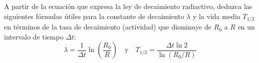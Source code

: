 \item A partir de la ecuación que expresa la ley de decaimiento radiactivo, deduzca las siguientes fórmulas útiles para la constante de decaimiento $\lambda$ y la vida media $T_{1/2}$ en términos de la tasa de decaimiento (actividad) que disminuye de $R_0$ a $R$ en un intervalo de tiempo $\Delta t$:
$$ \lambda = \frac{1}{\Delta t} \ln\left( \frac{R_0}{R} \right) \quad \text{y} \quad T_{1/2} = \frac{\Delta t \ln 2}{\ln(R_0/R)} $$